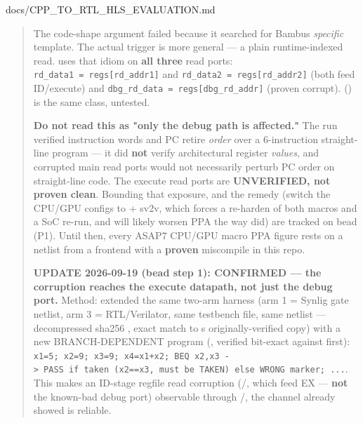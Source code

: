 \begin{relocated}{docs/CPP_TO_RTL_HLS_EVALUATION.md}
\begin{quote}
The code-shape argument failed because it searched for
Bambu\textquotesingle s \emph{specific}  template.
The actual trigger is more general --- a plain runtime-indexed read.
 uses that idiom on \textbf{all
three} read ports:
\texttt{rd\_\allowbreak{}data1\ =\allowbreak{}\ regs[rd\_\allowbreak{}addr1]}
and
\texttt{rd\_\allowbreak{}data2\ =\allowbreak{}\ regs[rd\_\allowbreak{}addr2]}
(both feed ID/\allowbreak{}execute) and
\texttt{dbg\_\allowbreak{}rd\_\allowbreak{}data\ =\allowbreak{}\ regs[dbg\_\allowbreak{}rd\_\allowbreak{}addr]}
(proven corrupt). 
() is the same class, untested.

\warn{} \textbf{Do not read this as "only the debug path is affected."}
The  run verified instruction words and PC retire \emph{order}
over a 6-instruction straight-line program --- it did \textbf{not}
verify architectural register \emph{values}, and corrupted main read
ports would not necessarily perturb PC order on straight-line code. The
execute read ports are \textbf{UNVERIFIED, not proven clean}. Bounding
that exposure, and the remedy (switch the CPU/GPU configs to
 + sv2v, which forces a re-harden of both macros
and a SoC re-run, and will likely worsen PPA the way 
did) are tracked on bead \textbf{} (P1). Until then, every
ASAP7 CPU/GPU macro PPA figure rests on a netlist from a frontend with a
\textbf{proven} miscompile in this repo.

\bad{} \textbf{UPDATE 2026-09-19 (bead  step 1): CONFIRMED ---
the corruption reaches the execute datapath, not just the debug port.}
Method: extended the same 
two-arm harness (arm 1 = Synlig gate netlist, arm 3 =
RTL/\allowbreak{}Verilator, same testbench file, same netlist ---
decompressed sha256 , exact match to
\textquotesingle s originally-verified copy) with a new
BRANCH-DEPENDENT program
(, verified bit-exact
against  first):
\texttt{x1=\allowbreak{}5;\ x2=\allowbreak{}9;\ x3=\allowbreak{}9;\ x4=\allowbreak{}x1+\allowbreak{}x2;\ BEQ\ x2,\allowbreak{}x3\ -\allowbreak{}>\ PASS\ if\ taken\ (x2=\allowbreak{}=\allowbreak{}x3,\allowbreak{}\ must\ be\ TAKEN)\ else\ WRONG\ marker;\ .\allowbreak{}.\allowbreak{}.\allowbreak{}}.
This makes an ID-stage regfile read corruption
(/, which feed EX --- \textbf{not} the
known-bad debug port) observable through
/, the channel  already
showed is reliable.


\end{quote}
\end{relocated}
